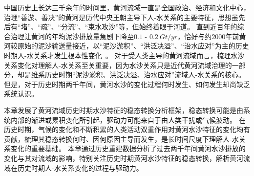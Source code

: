 

中国历史上长达三千余年的时间里，黄河流域一直是全国政治、经济和文化中心，治理“善淤、善决”的黄河是历代中央王朝主导下人-水关系的主要特征，思想虽先后有“堵”、“疏”、“分流”、“束水攻沙”等，但始终着眼于河道\cite{WangWeiJing2009}。
直到近百年的综合治理让黄河的年均泥沙排放量急剧下降至$0.1$ - $0.2~Gt/yr$，恰好与约$2000$年前黄河较原始的泥沙输送量接近，以“泥沙淤积”、“洪泛决溢”、“治水应对”为主的历史时期人-水关系才发生根本性变化~\cite{wang2007,song2020}。
对于受人类主导的黄河流域而言，梳理水沙关系变化对理解人-水关系至关重要，因为水沙关系只是近代黄河流域治理的一部分，却是维系历史时期“泥沙淤积、洪泛决溢、治水应对”流域人-水关系的核心。
但是，对于历史时期两千年间，黄河水沙的变化过程何时发生、如何发生却尚缺乏系统认识。


本章发展了黄河流域历史时期水沙特征的稳态转换分析框架，稳态转换可能是由系统内部的渐进或累积变化所引起，驱动力可能来自于由人类干扰或气候波动。
在历史时期，气候的变化和不断积累的人类活动双重作用对黄河水沙特征的变化均有贡献，梳理其稳态转换何时、因何原因主导而发生，是长时间尺度下理解人-水关系变化的重要基础。
本章通过历史重建数据分析了过去两千年间黄河水沙排放的变化与其对流域的影响，特别关注历史时期黄河水沙特征的稳态转换，解析黄河流域在历史时期人-水关系变化的过程与驱动力。


